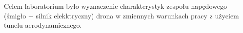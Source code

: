 \akapit Celem laboratorium było wyznaczenie charakterystyk zespołu napędowego (śmigło + silnik elekktryczny) drona w zmiennych warunkach pracy z użyciem tunelu aerodynamicznego. 
